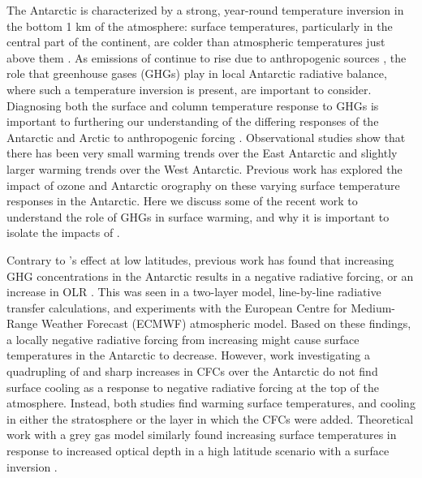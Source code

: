 \documentclass[draft]{agujournal2019}
\begin{document}
The Antarctic is characterized by a strong, year-round temperature inversion in the bottom 1 km of the atmosphere: surface temperatures, particularly in the central part of the continent, are colder than atmospheric temperatures just above them \cite{hudson_look_2005}. As emissions of  continue to rise due to anthropogenic sources \cite{peters_carbon_2020}, the role that greenhouse gases (GHGs) play in local Antarctic radiative balance, where such a temperature inversion is present, are important to consider. Diagnosing both the surface and column temperature response to GHGs is important to furthering our understanding of the differing responses of the Antarctic and Arctic to anthropogenic forcing \cite{manabe_sensitivity_1980}. Observational studies show that there has been very small warming trends over the East Antarctic \cite{smith_spatial_2017} and slightly larger warming trends over the West Antarctic. Previous work has explored the impact of ozone \cite{chiodo_large_2017} and Antarctic orography \cite{singh_low_2020} on these varying surface temperature responses in the Antarctic. Here we discuss some of the recent work to understand the role of GHGs in surface warming, and why it is important to isolate the impacts of . 

Contrary to 's effect at low latitudes, previous work has found that increasing GHG concentrations in the Antarctic results in a negative radiative forcing, or an increase in OLR \cite{schmithusen_how_2015,huang_inhomogeneous_2016}. This was seen in a two-layer model, line-by-line radiative transfer calculations, and experiments with the European Centre for Medium-Range Weather Forecast (ECMWF) atmospheric model. Based on these findings, a locally negative radiative forcing from increasing  might cause surface temperatures in the Antarctic to decrease. However, work investigating a quadrupling of  \cite{smith_no_2018} and sharp increases in CFCs over the Antarctic \cite{flanner_climate_2018} do not find surface cooling as a response to negative radiative forcing at the top of the atmosphere. Instead, both studies find warming surface temperatures, and cooling in either the stratosphere or the layer in which the CFCs were added. Theoretical work with a grey gas model similarly found increasing surface temperatures in response to increased optical depth in a high latitude scenario with a surface inversion \cite{payne_conceptual_2015}.
\end{document}
